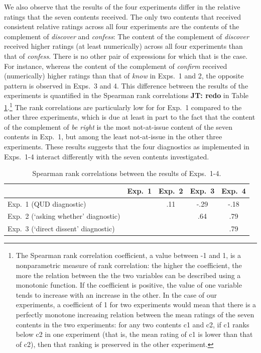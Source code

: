 \documentclass[times,linguex,xcolor]{glossa}
\begin{document}
 We also observe that the results of the four experiments differ in the relative ratings that the seven contents received. The only two contents that received consistent relative ratings across all four experiments are the contents of the complement of \emph{discover} and \emph{confess}: The content of the complement of \emph{discover} received higher ratings (at least numerically) across all four experiments than that of \emph{confess}. There is no other pair of expressions for which that is the case. For instance, whereas the content of the complement of \emph{confirm} received (numerically) higher ratings than that of \emph{know} in Exps.~1 and 2, the opposite pattern is observed in Exps.~3 and 4. This difference between the results of the experiments is quantified in the Spearman rank correlations  {\bf JT: redo} in Table \ref{t:spearman}.\footnote{The Spearman rank correlation coefficient, a value between -1 and 1, is a nonparametric measure of rank correlation: the higher the coefficient, the more the relation between the the two variables can be described using a monotonic function. If the coefficient is positive, the value of one variable tends to increase with an increase in the other. In the case of our experiments, a coefficient of 1 for two experiments would mean that there is a perfectly monotone increasing relation between the mean ratings of the seven contents in the two experiments: for any two contents c1 and c2, if c1 ranks below c2 in one experiment (that is, the mean rating of c1 is lower than that of c2), then that ranking is preserved in the other experiment.} The rank correlations are particularly low for for Exp.~1 compared to the other three experiments, which is due at least in part to the fact that the content of the complement of \emph{be right} is the most not-at-issue content of the seven contents in Exp.~1, but among the least not-at-issue in the other three experiments. These results suggests that the four diagnostics as implemented in Exps.~1-4 interact differently with the seven contents investigated.
   
  
 \begin{table}[ht!]
 \centering
 \begin{tabular}{l | c c c c}
 & Exp.~1 & Exp.~2 & Exp.~3 & Exp.~4 \\ \hline
 Exp.~1 (QUD diagnostic) & \cellcolor{lightgray} & .11 & -.29 & -.18 \\
 Exp.~2 (`asking whether' diagnostic) & \cellcolor{lightgray} & \cellcolor{lightgray} & .64 &.79 \\
 Exp.~3 (`direct dissent' diagnostic) & \cellcolor{lightgray}& \cellcolor{lightgray} & \cellcolor{lightgray} & .79  \\
 \hline
 \end{tabular}
 \caption{Spearman rank correlations between the results of Exps.~1-4.}\label{t:spearman}
 \end{table}
  
\end{document}
